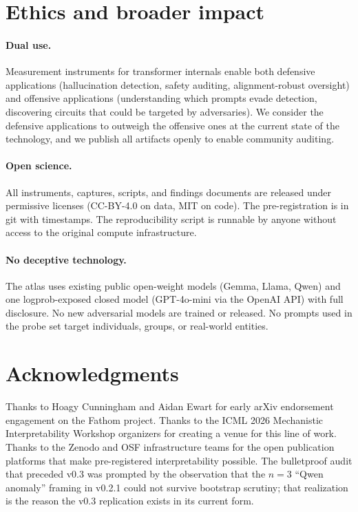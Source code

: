 \documentclass[11pt,letterpaper]{article}
\begin{document}
\section{Ethics and broader impact}
\label{sec:ethics}

\paragraph{Dual use.} Measurement instruments for transformer internals
enable both defensive applications (hallucination detection, safety
auditing, alignment-robust oversight) and offensive applications
(understanding which prompts evade detection, discovering circuits that
could be targeted by adversaries). We consider the defensive applications
to outweigh the offensive ones at the current state of the technology,
and we publish all artifacts openly to enable community auditing.

\paragraph{Open science.} All instruments, captures, scripts, and findings
documents are released under permissive licenses
(CC-BY-4.0 on data, MIT on code). The pre-registration is in git with
timestamps. The reproducibility script is runnable by anyone without
access to the original compute infrastructure.

\paragraph{No deceptive technology.} The atlas uses existing public
open-weight models (Gemma, Llama, Qwen) and one logprob-exposed closed
model (GPT-4o-mini via the OpenAI API) with full disclosure. No new
adversarial models are trained or released. No prompts used in the probe
set target individuals, groups, or real-world entities.

\section*{Acknowledgments}

Thanks to Hoagy Cunningham and Aidan Ewart for early arXiv endorsement
engagement on the Fathom project. Thanks to the ICML 2026 Mechanistic
Interpretability Workshop organizers for creating a venue for this line
of work. Thanks to the Zenodo and OSF infrastructure teams for the open
publication platforms that make pre-registered interpretability possible.
The bulletproof audit that preceded v0.3 was prompted by the observation
that the $n\!=\!3$ ``Qwen anomaly'' framing in v0.2.1 could not survive
bootstrap scrutiny; that realization is the reason the v0.3 replication
exists in its current form.
\end{document}
